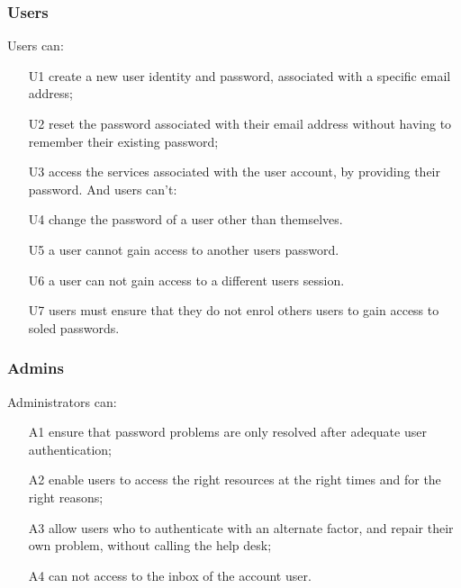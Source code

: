\fi
\iffalse
\subsubsection{Users}


Users can:
\begin{itemize}
\item[U1]\label{U1} create a new user identity and password, associated with a specific email address;
\item[U2]\label{U2} reset the password associated with their email address without having to remember
their existing password;
\item[U3]\label{U3} access the services associated with the user account, by providing their
password. And users can't:
\item[U4]\label{U4} change the password of a user other than themselves.
\item[U5]\label{U5}  a user cannot gain access to another users password.
\item[U6]\label{U6} a user can not gain access to a different users
session.
\item[U7]\label{U7} users must ensure that they do not enrol others users to gain access to soled passwords.
\end{itemize}

\subsubsection{Admins}
Administrators can:
\begin{itemize}
\item[A1] ensure that password problems are only resolved after adequate user authentication;
\item[A2] enable users to access the right resources at the right times and for the right reasons;
\item[A3] allow users who to authenticate with an alternate factor,
and repair their own problem, without calling the help desk;


\item[A4] can not access to the inbox of the account user.
\end{itemize}

